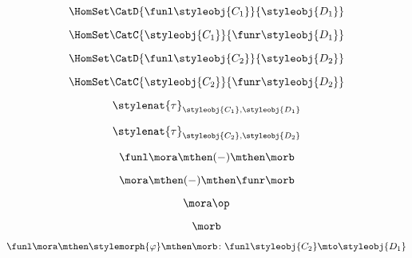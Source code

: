 \begin{forslides}
    \begin{equation}
        \label{eq:slides_adjunctions_62}
        \HomSet\CatD{\funl \styleobj{C_1}}{\styleobj{D_1}}
    \end{equation}

    \begin{equation}
        \label{eq:slides_adjunctions_63}
        \HomSet\CatC{\styleobj{C_1}}{\funr \styleobj{D_1} }
    \end{equation}

    \begin{equation}
        \label{eq:slides_adjunctions_64}
        \HomSet\CatD{\funl \styleobj{C_2}}{\styleobj{D_2}}
    \end{equation}

    \begin{equation}
        \label{eq:slides_adjunctions_65}
        \HomSet\CatC{\styleobj{C_2}}{\funr \styleobj{D_2} }
    \end{equation}

    \begin{equation}
        \label{eq:slides_adjunctions_66}
        \stylenat{\tau}_{\styleobj{C_1},\styleobj{D_1}}
    \end{equation}

    \begin{equation}
        \label{eq:slides_adjunctions_67}
        \stylenat{\tau}_{\styleobj{C_2},\styleobj{D_2}}
    \end{equation}

    \begin{equation}
        \label{eq:slides_adjunctions_68}
        \funl \mora \mthen ( - ) \mthen \morb
    \end{equation}

    \begin{equation}
        \label{eq:slides_adjunctions_69}
        \mora \mthen ( - ) \mthen \funr \morb
    \end{equation}

    \begin{equation}
        \label{eq:slides_adjunctions_70}
        \mora \op
    \end{equation}

    \begin{equation}
        \label{eq:slides_adjunctions_71}
        \morb
    \end{equation}

    \begin{equation}
        \label{eq:slides_adjunctions_72}
        \funl \mora \mthen \stylemorph{\varphi} \mthen \morb \colon \funl \styleobj{C_2} \mto \styleobj{D_1}
    \end{equation}


\end{forslides}
